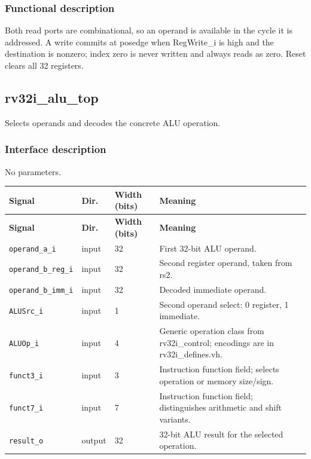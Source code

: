 \documentclass[11pt]{article}
\begin{document}
\subsubsection{Functional description}
\noindent Both read ports are combinational, so an operand is available in the cycle it is addressed. A write commits at posedge when RegWrite\_i is high and the destination is nonzero; index zero is never written and always reads as zero. Reset clears all 32 registers.\par\medskip

\subsection{rv32i\_alu\_top}
Selects operands and decodes the concrete ALU operation.
\subsubsection{Interface description}
\noindent No parameters.\par\medskip
{\small
\begin{longtable}{@{}L{0.3400\dimexpr\linewidth-36pt\relax}L{0.1000\dimexpr\linewidth-36pt\relax}L{0.1000\dimexpr\linewidth-36pt\relax}L{0.4600\dimexpr\linewidth-36pt\relax}@{}}
\toprule
\textbf{Signal} & \textbf{Dir.} & \textbf{Width (bits)} & \textbf{Meaning} \\ \midrule
\endfirsthead
\toprule
\textbf{Signal} & \textbf{Dir.} & \textbf{Width (bits)} & \textbf{Meaning} \\ \midrule
\endhead
\texttt{operand\_a\_i} & input & 32 & First 32-bit ALU operand. \\ \addlinespace[3pt]
\texttt{operand\_b\_reg\_i} & input & 32 & Second register operand, taken from rs2. \\ \addlinespace[3pt]
\texttt{operand\_b\_imm\_i} & input & 32 & Decoded immediate operand. \\ \addlinespace[3pt]
\texttt{ALUSrc\_i} & input & 1 & Second operand select: 0 register, 1 immediate. \\ \addlinespace[3pt]
\texttt{ALUOp\_i} & input & 4 & Generic operation class from rv32i\_control; encodings are in rv32i\_defines.vh. \\ \addlinespace[3pt]
\texttt{funct3\_i} & input & 3 & Instruction function field; selects operation or memory size/sign. \\ \addlinespace[3pt]
\texttt{funct7\_i} & input & 7 & Instruction function field; distinguishes arithmetic and shift variants. \\ \addlinespace[3pt]
\texttt{result\_o} & output & 32 & 32-bit ALU result for the selected operation. \\*
\bottomrule\end{longtable}}
\end{document}
